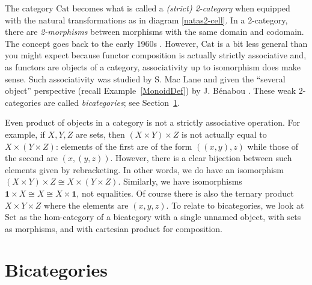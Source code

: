 \documentclass[a4paper,12pt]{article}
\theoremstyle{step}
\begin{document}
The category $\mathrm{Cat}$ becomes what is called a {\em (strict) 2-category} when equipped with the
natural transformations as in diagram \eqref{natas2-cell}. In a 2-category, there are 
{\em 2-morphisms} between morphisms with the same domain and codomain. The concept goes
back to the early 1960s \cite{Ehres, EilKel1966}. However, $\mathrm{Cat}$ is a bit less general than
you might expect because functor composition is actually strictly associative and, as
functors are objects of a category, associativity up to isomorphism does make sense. 
Such associativity was studied by S. Mac Lane \cite{ML1963} and given the ``several object'' perspective
(recall Example~\ref{MonoidDef}) by J. B\'enabou \cite{Ben}. 
These weak 2-categories are called {\em bicategories};
see Section~\ref{Bicats}.

Even product of objects in a category is not a strictly associative operation. For example, if $X,Y,Z$ are sets, then $(X\times Y)\times Z$ is not actually equal to $X\times (Y\times Z)$: elements of the first are of the form $((x,y),z)$ while those of the second are $(x,(y,z))$. However, there is a clear bijection between such elements given
by rebracketing. In other words, we do have an isomorphism $(X\times Y)\times Z \cong X\times (Y\times Z)$. Similarly, we have isomorphisms $\mathbf{1}\times X \cong X \cong X\times \mathbf{1}$, not equalities. Of course there is also the ternary product $X\times Y\times Z$ where the elements
are $(x,y,z)$. To relate to bicategories, we look at $\mathrm{Set}$ as the hom-category of a
bicategory with a single unnamed object, with sets as morphisms, and with cartesian product
for composition.  

\section{Bicategories}\label{Bicats}
\end{document}
